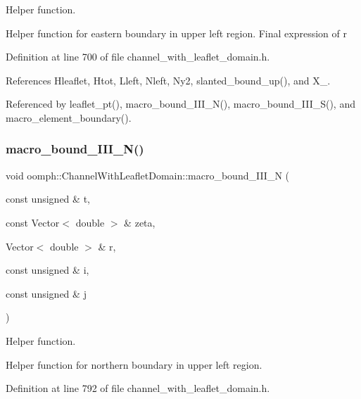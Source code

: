 Helper function. 

Helper function for eastern boundary in upper left region. Final expression of r 

Definition at line 700 of file channel\+\_\+with\+\_\+leaflet\+\_\+domain.\+h.



References Hleaflet, Htot, Lleft, Nleft, Ny2, slanted\+\_\+bound\+\_\+up(), and X\+\_.



Referenced by leaflet\+\_\+pt(), macro\+\_\+bound\+\_\+\+I\+I\+I\+\_\+\+N(), macro\+\_\+bound\+\_\+\+I\+I\+I\+\_\+\+S(), and macro\+\_\+element\+\_\+boundary().

\mbox{\label{classoomph_1_1ChannelWithLeafletDomain_a8b7f88fb218ceb09f0fde09ba22cd5b9}} 
\subsubsection{\texorpdfstring{macro\+\_\+bound\+\_\+\+I\+I\+I\+\_\+\+N()}{macro\_bound\_III\_N()}}
{\footnotesize\ttfamily void oomph\+::\+Channel\+With\+Leaflet\+Domain\+::macro\+\_\+bound\+\_\+\+I\+I\+I\+\_\+N (\begin{DoxyParamCaption}\item[{const unsigned \&}]{t,  }\item[{const Vector$<$ double $>$ \&}]{zeta,  }\item[{Vector$<$ double $>$ \&}]{r,  }\item[{const unsigned \&}]{i,  }\item[{const unsigned \&}]{j }\end{DoxyParamCaption})\hspace{0.3cm}{\ttfamily [protected]}}



Helper function. 

Helper function for northern boundary in upper left region. 

Definition at line 792 of file channel\+\_\+with\+\_\+leaflet\+\_\+domain.\+h.



